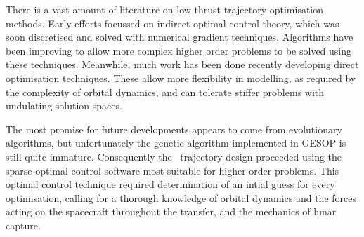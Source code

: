 There is a vast amount of literature on low thrust trajectory optimisation methods. Early efforts focussed on indirect optimal control theory, which was soon discretised and solved with numerical gradient techniques. Algorithms have been improving to allow more complex higher order problems to be solved using these techniques. Meanwhile, much work has been done recently developing direct optimisation techniques. These allow more flexibility in modelling, as required by the complexity of orbital dynamics, and can tolerate stiffer problems with undulating solution spaces. 

The most promise for future developments appears to come from evolutionary algorithms, but unfortunately the genetic algorithm implemented in GESOP is still quite immature. Consequently the \BW\ trajectory design proceeded using the sparse optimal control software most suitable for higher order problems. This optimal control technique required determination of an intial guess for every optimisation, calling for a thorough knowledge of orbital dynamics and the forces acting on the spacecraft throughout the transfer, and the mechanics of lunar capture.